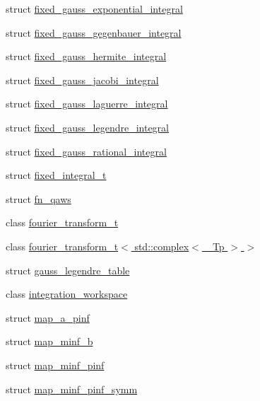 \begin{DoxyCompactItemize}
\item 
struct \hyperlink{struct____gnu__cxx_1_1fixed__gauss__exponential__integral}{fixed\+\_\+gauss\+\_\+exponential\+\_\+integral}
\item 
struct \hyperlink{struct____gnu__cxx_1_1fixed__gauss__gegenbauer__integral}{fixed\+\_\+gauss\+\_\+gegenbauer\+\_\+integral}
\item 
struct \hyperlink{struct____gnu__cxx_1_1fixed__gauss__hermite__integral}{fixed\+\_\+gauss\+\_\+hermite\+\_\+integral}
\item 
struct \hyperlink{struct____gnu__cxx_1_1fixed__gauss__jacobi__integral}{fixed\+\_\+gauss\+\_\+jacobi\+\_\+integral}
\item 
struct \hyperlink{struct____gnu__cxx_1_1fixed__gauss__laguerre__integral}{fixed\+\_\+gauss\+\_\+laguerre\+\_\+integral}
\item 
struct \hyperlink{struct____gnu__cxx_1_1fixed__gauss__legendre__integral}{fixed\+\_\+gauss\+\_\+legendre\+\_\+integral}
\item 
struct \hyperlink{struct____gnu__cxx_1_1fixed__gauss__rational__integral}{fixed\+\_\+gauss\+\_\+rational\+\_\+integral}
\item 
struct \hyperlink{struct____gnu__cxx_1_1fixed__integral__t}{fixed\+\_\+integral\+\_\+t}
\item 
struct \hyperlink{struct____gnu__cxx_1_1fn__qaws}{fn\+\_\+qaws}
\item 
class \hyperlink{class____gnu__cxx_1_1fourier__transform__t}{fourier\+\_\+transform\+\_\+t}
\item 
class \hyperlink{class____gnu__cxx_1_1fourier__transform__t_3_01std_1_1complex_3_01__Tp_01_4_01_4}{fourier\+\_\+transform\+\_\+t$<$ std\+::complex$<$ \+\_\+\+Tp $>$ $>$}
\item 
struct \hyperlink{struct____gnu__cxx_1_1gauss__legendre__table}{gauss\+\_\+legendre\+\_\+table}
\item 
class \hyperlink{class____gnu__cxx_1_1integration__workspace}{integration\+\_\+workspace}
\item 
struct \hyperlink{struct____gnu__cxx_1_1map__a__pinf}{map\+\_\+a\+\_\+pinf}
\item 
struct \hyperlink{struct____gnu__cxx_1_1map__minf__b}{map\+\_\+minf\+\_\+b}
\item 
struct \hyperlink{struct____gnu__cxx_1_1map__minf__pinf}{map\+\_\+minf\+\_\+pinf}
\item 
struct \hyperlink{struct____gnu__cxx_1_1map__minf__pinf__symm}{map\+\_\+minf\+\_\+pinf\+\_\+symm}
\item 

\end{DoxyCompactItemize}
